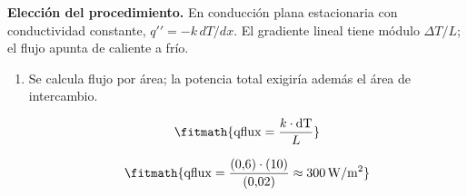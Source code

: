 \noindent\textbf{Elección del procedimiento.} En conducción plana estacionaria con conductividad constante, $q\prime\prime=-k\,dT/dx$. El gradiente lineal tiene módulo $\Delta T/L$; el flujo apunta de caliente a frío.

\begin{enumerate}

\item Se calcula flujo por área; la potencia total exigiría además el área de intercambio.

\[\fitmath{\mathrm{qflux}=\frac{k\cdot \mathrm{dT}}{L}}\]

\[\fitmath{\mathrm{qflux}=\frac{(0{,}6)\cdot (10)}{(0{,}02)}\approx 300\,\mathrm{W/m^{2}}}\]

\end{enumerate}
